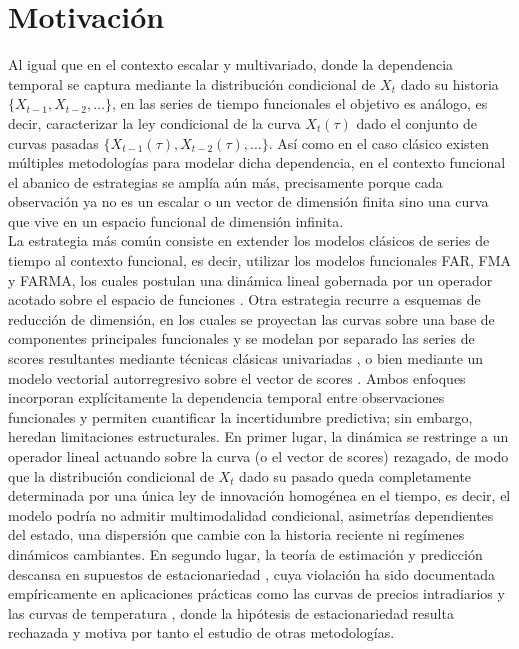 \section{Motivación}
\label{03_01_00_motivacion}
 
Al igual que en el contexto escalar y multivariado, donde la dependencia temporal se captura mediante la distribución condicional de $X_t$ dado su historia $\{X_{t-1}, X_{t-2}, \ldots\}$, en las series de tiempo funcionales el objetivo es análogo, es decir, caracterizar la ley condicional de la curva $X_t(\tau)$ dado el conjunto de curvas pasadas $\{X_{t-1}(\tau), X_{t-2}(\tau), \ldots\}$. Así como en el caso clásico existen múltiples metodologías para modelar dicha dependencia, en el contexto funcional el abanico de estrategias se amplía aún más, precisamente porque cada observación ya no es un escalar o un vector de dimensión finita sino una curva que vive en un espacio funcional de dimensión infinita.\\
 
La estrategia más común consiste en extender los modelos clásicos de series de tiempo al contexto funcional, es decir, utilizar los modelos funcionales FAR, FMA y FARMA, los cuales postulan una dinámica lineal gobernada por un operador acotado sobre el espacio de funciones \citep{02_02_bosq2000linear}. Otra estrategia recurre a esquemas de reducción de dimensión, en los cuales se proyectan las curvas sobre una base de componentes principales funcionales y se modelan por separado las series de scores resultantes mediante técnicas clásicas univariadas \citep{03_00_hyndman2007robust,03_00_hyndman2009forecasting}, o bien mediante un modelo vectorial autorregresivo sobre el vector de scores \citep{02_02_aue2015prediction}. Ambos enfoques incorporan explícitamente la dependencia temporal entre observaciones funcionales y permiten cuantificar la incertidumbre predictiva; sin embargo, heredan limitaciones estructurales. En primer lugar, la dinámica se restringe a un operador lineal actuando sobre la curva (o el vector de scores) rezagado, de modo que la distribución condicional de $X_t$ dado su pasado queda completamente determinada por una única ley de innovación homogénea en el tiempo, es decir, el modelo podría no admitir multimodalidad condicional, asimetrías dependientes del estado, una dispersión que cambie con la historia reciente ni regímenes dinámicos cambiantes. En segundo lugar, la teoría de estimación y predicción descansa en supuestos de estacionariedad \citep{03_00_hormann2010weakly,02_02_aue2015prediction}, cuya violación ha sido documentada empíricamente en aplicaciones prácticas como las curvas de precios intradiarios \citep{03_00_horvath2014testing} y las curvas de temperatura \citep{03_00_aue2018detecting}, donde la hipótesis de estacionariedad resulta rechazada y motiva por tanto el estudio de otras metodologías.\\
 

